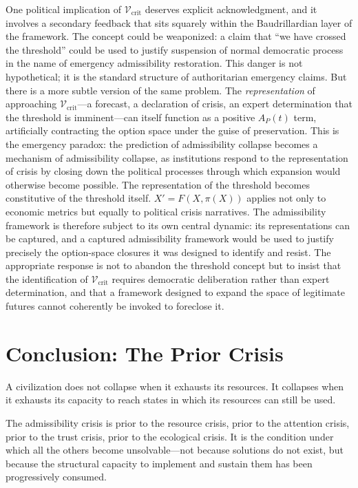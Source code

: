 \documentclass[11pt, letterpaper]{article}
\begin{document}
One political implication of $\mathcal{V}_{\text{crit}}$ deserves explicit acknowledgment, and it involves a secondary feedback that sits squarely within the Baudrillardian layer of the framework. The concept could be weaponized: a claim that ``we have crossed the threshold'' could be used to justify suspension of normal democratic process in the name of emergency admissibility restoration. This danger is not hypothetical; it is the standard structure of authoritarian emergency claims. But there is a more subtle version of the same problem. The \emph{representation} of approaching $\mathcal{V}_{\text{crit}}$---a forecast, a declaration of crisis, an expert determination that the threshold is imminent---can itself function as a positive $A_P(t)$ term, artificially contracting the option space under the guise of preservation. This is the emergency paradox: the prediction of admissibility collapse becomes a mechanism of admissibility collapse, as institutions respond to the representation of crisis by closing down the political processes through which expansion would otherwise become possible. The representation of the threshold becomes constitutive of the threshold itself. $X' = F(X, \pi(X))$ applies not only to economic metrics but equally to political crisis narratives. The admissibility framework is therefore subject to its own central dynamic: its representations can be captured, and a captured admissibility framework would be used to justify precisely the option-space closures it was designed to identify and resist. The appropriate response is not to abandon the threshold concept but to insist that the identification of $\mathcal{V}_{\text{crit}}$ requires democratic deliberation rather than expert determination, and that a framework designed to expand the space of legitimate futures cannot coherently be invoked to foreclose it.

\section{Conclusion: The Prior Crisis}

A civilization does not collapse when it exhausts its resources. It collapses when it exhausts its capacity to reach states in which its resources can still be used.

The admissibility crisis is prior to the resource crisis, prior to the attention crisis, prior to the trust crisis, prior to the ecological crisis. It is the condition under which all the others become unsolvable---not because solutions do not exist, but because the structural capacity to implement and sustain them has been progressively consumed.
\end{document}
